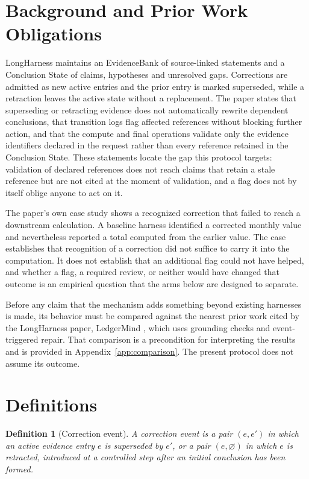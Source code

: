 \documentclass[11pt]{article}
\newtheorem{definition}{Definition}
\begin{document}
\section{Background and Prior Work Obligations}\label{sec:background}

LongHarness \cite{huang2026longharness} maintains an EvidenceBank of source-linked statements and a Conclusion State of claims, hypotheses and unresolved gaps. Corrections are admitted as new active entries and the prior entry is marked superseded, while a retraction leaves the active state without a replacement. The paper states that superseding or retracting evidence does not automatically rewrite dependent conclusions, that transition logs flag affected references without blocking further action, and that the compute and final operations validate only the evidence identifiers declared in the request rather than every reference retained in the Conclusion State. These statements locate the gap this protocol targets: validation of declared references does not reach claims that retain a stale reference but are not cited at the moment of validation, and a flag does not by itself oblige anyone to act on it.

The paper's own case study shows a recognized correction that failed to reach a downstream calculation. A baseline harness identified a corrected monthly value and nevertheless reported a total computed from the earlier value. The case establishes that recognition of a correction did not suffice to carry it into the computation. It does not establish that an additional flag could not have helped, and whether a flag, a required review, or neither would have changed that outcome is an empirical question that the arms below are designed to separate.

Before any claim that the mechanism adds something beyond existing harnesses is made, its behavior must be compared against the nearest prior work cited by the LongHarness paper, LedgerMind \cite{du2026ledgermind}, which uses grounding checks and event-triggered repair. That comparison is a precondition for interpreting the results and is provided in Appendix~\ref{app:comparison}. The present protocol does not assume its outcome.

\section{Definitions}\label{sec:definitions}

\begin{definition}[Correction event]
A correction event is a pair $(e,e')$ in which an active evidence entry $e$ is superseded by $e'$, or a pair $(e,\varnothing)$ in which $e$ is retracted, introduced at a controlled step after an initial conclusion has been formed.
\end{definition}
\end{document}
